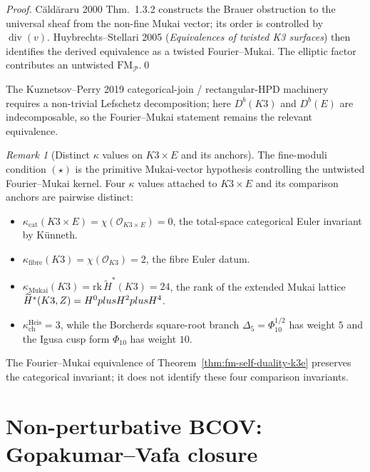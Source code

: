 \documentclass[12pt]{amsart}
\theoremstyle{remark}
\newtheorem{rmk}[thm]{Remark}
\providecommand{\cO}{\mathcal{O}}
\begin{document}
\begin{proof}
  C\u{a}ld\u{a}raru 2000 Thm.\ 1.3.2 constructs the Brauer obstruction
  to the universal sheaf from the non-fine Mukai vector; its order is
  controlled by \(\operatorname{div}(v)\). Huybrechts--Stellari 2005
  (\emph{Equivalences of twisted
  K3 surfaces}) then identifies the derived equivalence as a twisted
  Fourier--Mukai. The elliptic factor contributes an untwisted
  $\mathrm{FM}_{\mathcal{P}}$.\qed
\end{proof}

The Kuznetsov--Perry 2019 categorical-join / rectangular-HPD machinery
requires a non-trivial Lefschetz decomposition; here
$D^b(K3)$ and $D^b(E)$ are indecomposable, so the Fourier--Mukai
statement remains the relevant equivalence.

\begin{rmk}[Distinct $\kappa$ values on $K3\times E$ and its anchors]
  The fine-moduli condition \((\star)\) is the primitive Mukai-vector hypothesis
  controlling the untwisted Fourier--Mukai kernel.  Four \(\kappa\)
  values attached to \(K3\times E\) and its comparison anchors are
  pairwise distinct:
  \begin{itemize}
    \item \(\kappa_{\mathrm{cat}}(K3\times E)=\chi(\cO_{K3\times E})=0\),
      the total-space categorical Euler invariant by K\"unneth.
    \item \(\kappa_{\mathrm{fibre}}(K3)=\chi(\cO_{K3})=2\), the fibre
      Euler datum.
    \item \(\kappa_{\mathrm{Mukai}}(K3)=\mathrm{rk}\,\widetilde H^*(K3)=24\), the rank of the
      extended Mukai lattice
      \(\widetilde H^*(K3,Z)=H^0plus H^2plus H^4\).
	    \item \(\kappa_{\mathrm{ch}}^{\mathrm{Heis}}=3\), while the
	      Borcherds square-root branch \(\Delta_5=\Phi_{10}^{1/2}\) has
	      weight \(5\) and the Igusa cusp form \(\Phi_{10}\) has weight
	      \(10\).
	  \end{itemize}
	  The Fourier--Mukai equivalence of
	  Theorem~\ref{thm:fm-self-duality-k3e} preserves the categorical
	  invariant; it does not identify these four comparison invariants.
\end{rmk}

\section{Non-perturbative BCOV: Gopakumar--Vafa closure}
\label{sec:bcov-np-closure}
\end{document}
